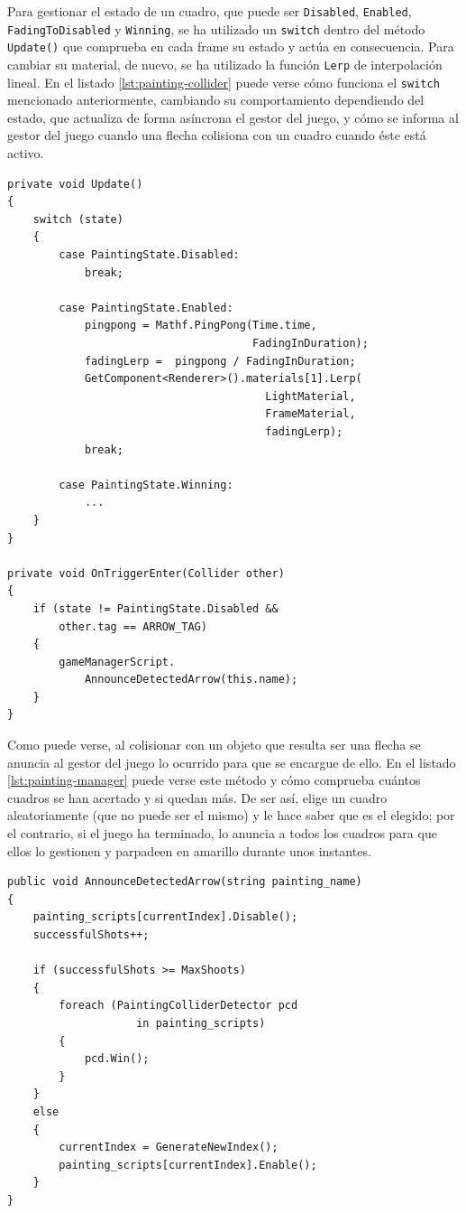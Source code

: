 Para gestionar el estado de un cuadro, que puede ser \texttt{Disabled}, \texttt{Enabled}, \texttt{FadingToDisabled} y \texttt{Winning}, se ha utilizado un \texttt{switch} dentro del método \texttt{Update()} que comprueba en cada frame su estado y actúa en consecuencia. Para cambiar su material, de nuevo, se ha utilizado la función \texttt{Lerp} de interpolación lineal. 
En el listado \ref{lst:painting-collider} puede verse cómo funciona el \texttt{switch} mencionado anteriormente, cambiando su comportamiento dependiendo del estado, que actualiza de forma asíncrona el gestor del juego, y cómo se informa al gestor del juego cuando una flecha colisiona con un cuadro cuando éste está activo.

\begin{lstlisting}[caption=Fragmento del script para actualizar un cuadro, label=lst:painting-collider]
private void Update()
{
    switch (state)
    {
        case PaintingState.Disabled:
            break;
        
        case PaintingState.Enabled:
            pingpong = Mathf.PingPong(Time.time, 
                                      FadingInDuration);
            fadingLerp =  pingpong / FadingInDuration;
            GetComponent<Renderer>().materials[1].Lerp(
                                        LightMaterial,
                                        FrameMaterial,
                                        fadingLerp);
            break;
    
        case PaintingState.Winning:
            ...
    }
}

private void OnTriggerEnter(Collider other)
{
    if (state != PaintingState.Disabled && 
        other.tag == ARROW_TAG)
    {
        gameManagerScript.
            AnnounceDetectedArrow(this.name);
    }
}
\end{lstlisting}

Como puede verse, al colisionar con un objeto que resulta ser una flecha se anuncia al gestor del juego lo ocurrido para que se encargue de ello. En el listado \ref{lst:painting-manager} puede verse este método y cómo comprueba cuántos cuadros se han acertado y si quedan más. De ser así, elige un cuadro aleatoriamente (que no puede ser el mismo) y le hace saber que es el elegido; por el contrario, si el juego ha terminado, lo anuncia a todos los cuadros para que ellos lo gestionen y parpadeen en amarillo durante unos instantes.

\begin{lstlisting}[caption=Fragmento del script para gestionar el juego del arco, label=lst:painting-manager]
public void AnnounceDetectedArrow(string painting_name)
{
    painting_scripts[currentIndex].Disable();
    successfulShots++;

    if (successfulShots >= MaxShoots)
    {
        foreach (PaintingColliderDetector pcd
                    in painting_scripts)
        {
            pcd.Win();
        }
    }
    else
    {
        currentIndex = GenerateNewIndex();
        painting_scripts[currentIndex].Enable();
    }
}
\end{lstlisting}


